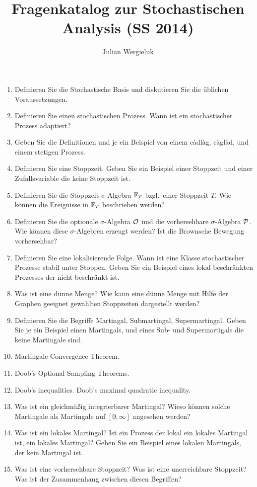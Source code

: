 \documentclass[11pt,oneside]{amsart}
\title{Fragenkatalog zur Stochastischen Analysis (SS 2014)}
\author{Julian Wergieluk}
\begin{document}
\maketitle

\begin{enumerate}
    \item Definieren Sie die Stochastische Basis und diskutieren Sie die
        üblichen Voraussetzungen.
    \item Definieren Sie einen stochastischen Prozess. Wann ist ein
        stochastischer Prozess adaptiert?
    \item Geben Sie die Definitionen und je ein Beispiel von einem c\`adl\`ag,
        c\`agl\`ad, und einem stetigen Prozess.
    \item Definieren Sie eine Stoppzeit. Geben Sie ein Beispiel einer Stoppzeit
        und einer Zufallsvariable die keine Stoppzeit ist.
    \item Definieren Sie die Stoppzeit-$\sigma$-Algebra $\mathbb F_{T}$ bzgl.\ einer 
        Stoppzeit $T$. Wie können die Ereignisse in $\mathbb F_{T}$ beschrieben werden?
    \item Definieren Sie die optionale $\sigma$-Algebra $\mathcal O$ und die
        vorhersehbare $\sigma$-Algebra $\mathcal P$. Wie können diese
        $\sigma$-Algebren erzeugt werden? Ist die Brownsche Bewegung
        vorhersehbar?
    \item Definieren Sie eine lokalisierende Folge. Wann ist eine Klasse stochastischer
        Prozesse stabil unter Stoppen. Geben Sie ein Beispiel eines lokal
        beschränkten Prozesses der nicht beschränkt ist. 
    \item Was ist eine dünne Menge? Wie kann eine dünne Menge mit Hilfe der
        Graphen geeignet gewählten Stoppzeiten dargestellt werden?

    \item Definieren Sie die Begriffe Martingal, Submartingal, Supermartingal.
        Geben Sie je ein Beispiel einen Martingals, und eines Sub- und
        Supermartigals die keine Martingale sind.

    \item Martingale Convergence Theorem.
    \item Doob's Optional Sampling Theorems.
    \item Doob's inequalities. Doob's maximal quadratic inequality.

    \item Was ist ein gleichmäßig integrierbarer Martingal? Wieso können solche
        Martingale als Martingale auf $[0,\infty]$ angesehen werden?
    \item Was ist ein lokales Martingal? Ist ein Prozess der lokal ein lokales
        Martingal ist, ein lokales Martingal? Geben Sie ein Beispiel eines
        lokalen Martingals, der kein Martingal ist.

    \item Was ist eine vorhersehbare Stoppzeit? Was ist eine unerreichbare Stoppzeit? 
        Was ist der Zusammenhang zwischen diesen Begriffen? 
\end{enumerate}
\end{document}
